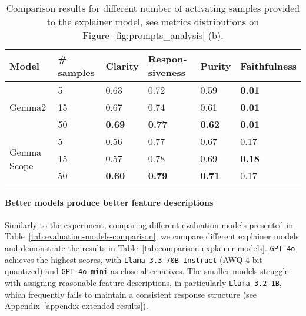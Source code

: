 \begin{table}[t]
\scriptsize
\centering
\begin{tabular}{p{0.7cm}p{0.8cm}p{0.8cm}p{0.8cm}p{0.8cm}p{1.2cm}}  
Model & \# samples & Clarity      & Respon-siveness & Purity   & Faithfulness \\ \hline \hline 
\multirow{3}{1cm}{Gemma2} & 5      &    0.63 &  0.72   & 0.59   &  \textbf{0.01}    \\
                          & 15     &    0.67 &  0.74   & 0.61   &  \textbf{0.01}  \\ 
                          & 50     &    \textbf{0.69} &  \textbf{0.77}   & \textbf{0.62}   &  \textbf{0.01} \\  \hline 
\multirow{3}{1cm}{Gemma Scope} & 5 & 0.56          & 0.77          & 0.67          & 0.17 \\
                          & 15     & 0.57          & 0.78          & 0.69          & \textbf{0.18} \\ 
                          & 50     & \textbf{0.60} & \textbf{0.79} & \textbf{0.71} & 0.17 \\  \hline 
\end{tabular}
\caption{Comparison results for different number of activating samples provided to the explainer model, see metrics distributions on Figure~\ref{fig:prompts_analysis} (b). }
\label{tab:comparison-samples-number}
\end{table}


\paragraph{Better models produce better feature descriptions} 
Similarly to the experiment, comparing different evaluation models presented in Table~\ref{tab:evaluation-models-comparison}, we compare different explainer models and demonstrate the results in Table~\ref{tab:comparison-explainer-models}. 
\texttt{GPT-4o} achieves the highest scores, with \texttt{Llama-3.3-70B-Instruct} (AWQ 4-bit quantized) and \texttt{GPT-4o mini} as close alternatives. The smaller models struggle with assigning reasonable feature descriptions, in particularly \texttt{Llama-3.2-1B}, which frequently fails to maintain a consistent response structure (see Appendix~\ref{appendix-extended-results}). 

